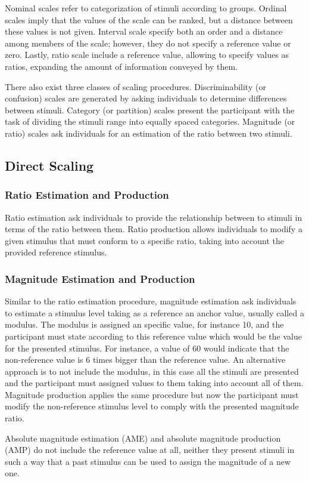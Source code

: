 \documentclass[../main.tex]{subfiles}
\begin{document}
\begin{theoreticalbackground}
Nominal scales refer to categorization of stimuli according to groups. Ordinal
scales imply that the values of the scale can be ranked, but a distance between
these values is not given. Interval scale specify both an order and a distance
among members of the scale; however, they do not specify a reference value or
zero. Lastly, ratio scale include a reference value, allowing to specify values
as ratios, expanding the amount of information conveyed by them.

There also exist three classes of scaling procedures. Discriminability (or
confusion) scales are generated by asking individuals to determine differences
between stimuli. Category (or partition) scales present the participant with the
task of dividing the stimuli range into equally spaced categories. Magnitude (or
ratio) scales ask individuals for an estimation of the ratio between two
stimuli.

\subsection{Direct Scaling}

\subsubsection{Ratio Estimation and Production}

Ratio estimation ask individuals to provide the relationship between to stimuli
in terms of the ratio between them. Ratio production allows individuals to
modify a given stimulus that must conform to a specific ratio, taking into
account the provided reference stimulus.

\subsubsection{Magnitude Estimation and Production}

Similar to the ratio estimation procedure, magnitude estimation ask individuals
to estimate a stimulus level taking as a reference an anchor value, usually
called a modulus. The modulus is assigned an specific value, for instance 10,
and the participant must state according to this reference value which would be
the value for the presented stimulus. For instance, a value of 60 would indicate
that the non-reference value is 6 times bigger than the reference value. An
alternative approach is to not include the modulus, in this case all the stimuli
are presented and the participant must assigned values to them taking into
account all of them. Magnitude production applies the same procedure but now the
participant must modify the non-reference stimulus level to comply with the
presented magnitude ratio.

Absolute magnitude estimation (AME) and absolute magnitude production (AMP)
do not include the reference value at all, neither they present stimuli in such
a way that a past stimulus can be used to assign the magnitude of a new one.

\end{theoreticalbackground}
\end{document}
